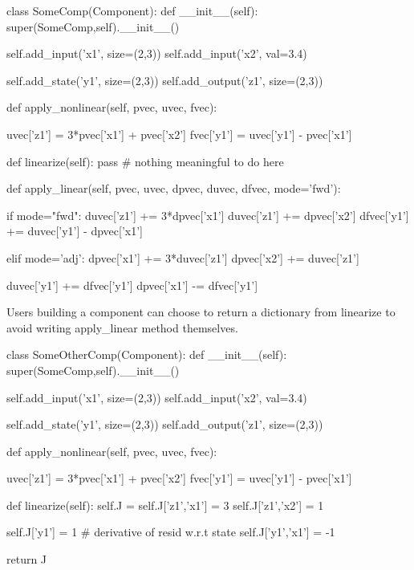 \documentclass[12pt]{article}
\begin{document}
\begin{pyglist}[language=python]
    class SomeComp(Component):
        def __init__(self):
            super(SomeComp,self).__init__()

            self.add_input('x1', size=(2,3))
            self.add_input('x2', val=3.4)

            self.add_state('y1', size=(2,3))
            self.add_output('z1', size=(2,3))

        def apply_nonlinear(self, pvec, uvec, fvec):

            uvec['z1'] = 3*pvec['x1'] + pvec['x2']
            fvec['y1'] = uvec['y1'] - pvec['x1']

        def linearize(self):
            pass # nothing meaningful to do here

        def apply_linear(self, pvec, uvec, dpvec, duvec, dfvec, mode='fwd'):

            if mode="fwd":
                duvec['z1'] += 3*dpvec['x1']
                duvec['z1'] += dpvec['x2']
                dfvec['y1'] += duvec['y1'] - dpvec['x1']

            elif mode='adj':
                dpvec['x1'] += 3*duvec['z1']
                dpvec['x2'] += duvec['z1']

                duvec['y1'] += dfvec['y1']
                dpvec['x1'] -= dfvec['y1']
\end{pyglist}

Users building a component can choose to return a dictionary from linearize to avoid
writing apply\_linear method themselves.

\begin{pyglist}[language=python]
    class SomeOtherComp(Component):
        def __init__(self):
            super(SomeComp,self).__init__()

            self.add_input('x1', size=(2,3))
            self.add_input('x2', val=3.4)

            self.add_state('y1', size=(2,3))
            self.add_output('z1', size=(2,3))

        def apply_nonlinear(self, pvec, uvec, fvec):

            uvec['z1'] = 3*pvec['x1'] + pvec['x2']
            fvec['y1'] = uvec['y1'] - pvec['x1']

        def linearize(self):
            self.J = {}
            self.J['z1','x1'] = 3
            self.J['z1','x2'] = 1

            self.J['y1'] = 1 # derivative of resid w.r.t state
            self.J['y1','x1'] = -1

            return J
\end{pyglist}
\end{document}
